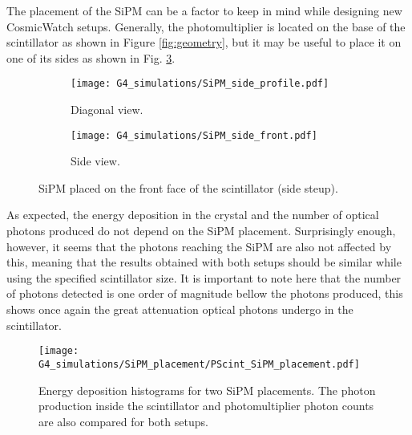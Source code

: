The placement of the SiPM can be a factor to keep in mind while designing new CosmicWatch setups. Generally, the photomultiplier is located on the base of the scintillator as shown in Figure \ref{fig:geometry}, but it may be useful to place it on one of its sides as shown in Fig. \ref{fig:SiPM_side}.
\begin{figure}
  \centering
  \begin{subfigure}[t]{0.48\textwidth}
    \texttt{[image: G4\_simulations/SiPM\_side\_profile.pdf]}
    \caption{\label{sfig:SiPM_side_profile}Diagonal view.}
  \end{subfigure}
  \hfill
  \begin{subfigure}[t]{0.48\textwidth}
    \texttt{[image: G4\_simulations/SiPM\_side\_front.pdf]}
    \caption{\label{sfig:SiPM_side_front}Side view.}
  \end{subfigure}
  \caption{\label{fig:SiPM_side}SiPM placed on the front face of the scintillator (side steup).}
\end{figure}

As expected, the energy deposition in the crystal and the number of optical photons produced do not depend on the SiPM placement. Surprisingly enough, however, it seems that the photons reaching the SiPM are also not affected by this, meaning that the results obtained with both setups should be similar while using the specified scintillator size. It is important to note here that the number of photons detected is one order of magnitude bellow the photons produced, this shows once again the great attenuation optical photons undergo in the scintillator.

\begin{figure}[H]
  \centering
  \texttt{[image: G4\_simulations/SiPM\_placement/PScint\_SiPM\_placement.pdf]}
  \caption{\label{fig:LYSO_PScint_phot_count}Energy deposition histograms for two SiPM placements. The photon production inside the scintillator and photomultiplier photon counts are also compared for both setups.}
\end{figure}



